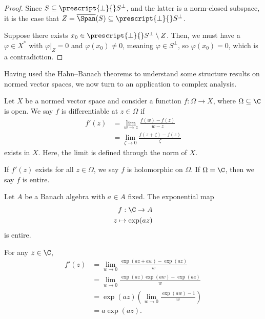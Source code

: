 \documentclass[10pt]{mypackage}
\begin{document}
  \begin{proof}
    Since $S\subseteq \prescript{\perp}{}S^{\perp}$, and the latter is a norm-closed subspace, it is the case that $Z = \overline{\Span}(S)\subseteq \prescript{\perp}{}S^{\perp}$.\newline

  Suppose there exists $x_0\in \prescript{\perp}{}S^{\perp}\setminus Z$. Then, we must have a $\varphi\in X^{\ast}$ with $\varphi|_{Z} = 0$ and $\varphi(x_0)\neq 0$, meaning $\varphi\in S^{\perp}$, so $\varphi\left(x_0\right) = 0$, which is a contradiction.
  \end{proof}
  Having used the Hahn--Banach theorems to understand some structure results on normed vector spaces, we now turn to an application to complex analysis.
  \begin{definition}
    Let $X$ be a normed vector space and consider a function $f: \Omega\rightarrow X$, where $\Omega\subseteq \C$ is open. We say $f$ is differentiable at $z\in \Omega$ if
    \begin{align*}
      f'(z) &= \lim_{w\rightarrow z}\frac{f(w)-f(z)}{w-z}\\
            &= \lim_{\zeta \rightarrow 0}\frac{f(z + \zeta) - f(z)}{\zeta}
    \end{align*}
    exists in $X$. Here, the limit is defined through the norm of $X$.\newline

    If $f'(z)$ exists for all $z\in \Omega$, we say $f$ is holomorphic on $\Omega$. If $\Omega = \C$, then we say $f$ is entire.
  \end{definition}
  \begin{example}
    Let $A$ be a Banach algebra with $a\in A$ fixed. The exponential map
    \begin{align*}
      f: \C\rightarrow A\\
      z\mapsto \exp(az)
    \end{align*}
    is entire.\newline

    For any $z\in \C$,
    \begin{align*}
      f'(z) &= \lim_{w \rightarrow 0}\frac{\exp(az + aw) - \exp(az)}{w}\\
            &= \lim_{w\rightarrow 0}\frac{\exp(az)\exp(aw) - \exp(az)}{w}\\
            &= \exp(az)\left(\lim_{w\rightarrow 0}\frac{\exp(aw)-1}{w}\right)\\
            &= a\exp(az).
    \end{align*}
  \end{example}
\end{document}
